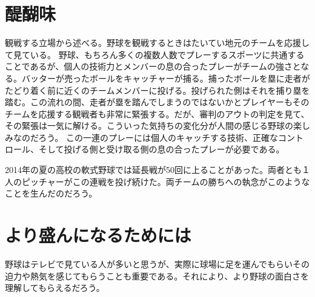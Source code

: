 \documentclass[10.5pt]{jarticle}
\begin{document}
\newpage
\section{醍醐味}
観戦する立場から述べる。野球を観戦するときはたいてい地元のチームを応援して見ている。
野球、もちろん多くの複数人数でプレーするスポーツに共通することであるが、個人の技術力とメンバーの息の合ったプレーがチームの強さとなる。バッターが売ったボールをキャッチャーが捕る。捕ったボールを塁に走者がたどり着く前に近くのチームメンバーに投げる。投げられた側はそれを捕り塁を踏む。この流れの間、走者が塁を踏んでしまうのではないかとプレイヤーもそのチームを応援する観戦者も非常に緊張する。だが、審判のアウトの判定を見て、その緊張は一気に解ける。こういった気持ちの変化分が人間の感じる野球の楽しみなのだろう。
この一連のプレーには個人のキャッチする技術、正確なコントロール、そして投げる側と受け取る側の息の合ったプレーが必要である。

2014年の夏の高校の軟式野球では延長戦が50回に上ることがあった。両者とも１人のピッチャーがこの連戦を投げ続けた。両チームの勝ちへの執念がこのようなことを生んだのだろう。


\section{より盛んになるためには}
野球はテレビで見ている人が多いと思うが、実際に球場に足を運んでもらいその迫力や熱気を感じてもらうことも重要である。それにより、より野球の面白さを理解してもらえるだろう。
\end{document}
